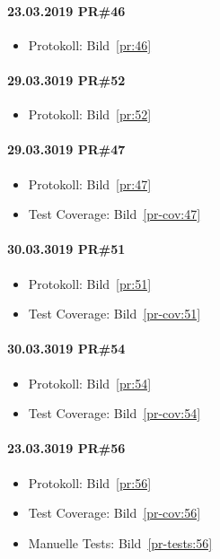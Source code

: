 \documentclass[accentcolor=tud0b,12pt,paper=a4]{tudreport}
\begin{document}
\paragraph{23.03.2019 PR\#46}
\begin{itemize}
\item Protokoll: Bild~\ref{pr:46}
\end{itemize}

\paragraph{29.03.3019 PR\#52}
\begin{itemize}
\item Protokoll: Bild~\ref{pr:52}
\end{itemize}

\paragraph{29.03.3019 PR\#47}
\begin{itemize}
\item Protokoll: Bild~\ref{pr:47}
\item Test Coverage: Bild~\ref{pr-cov:47}
\end{itemize}

\paragraph{30.03.3019 PR\#51}
\begin{itemize}
\item Protokoll: Bild~\ref{pr:51}
\item Test Coverage: Bild~\ref{pr-cov:51}
\end{itemize}

\paragraph{30.03.3019 PR\#54}
\begin{itemize}
\item Protokoll: Bild~\ref{pr:54}
\item Test Coverage: Bild~\ref{pr-cov:54}
\end{itemize}

\paragraph{23.03.3019 PR\#56}
\begin{itemize}
\item Protokoll: Bild~\ref{pr:56}
\item Test Coverage: Bild~\ref{pr-cov:56}
\item Manuelle Tests: Bild~\ref{pr-tests:56}
\end{itemize}
\end{document}
